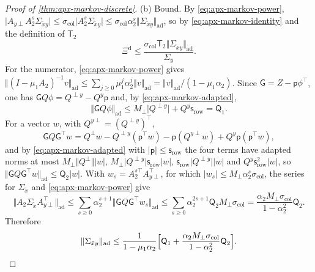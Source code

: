 \begin{proof}[Proof of \cref{thm:apx-markov-discrete}]
(b) Bound. By \eqref{eq:apx-markov-power}, $\lvert A_{y\perp}A_2^s\Sigma_{\tilde xy}\rvert\le\sigma_{\mathrm{col}}\lvert A_2^s\Sigma_{\tilde xy}\rvert\le\sigma_{\mathrm{col}}\alpha_2^s\Vert\Sigma_{\tilde xy}\Vert_{\mathrm{ad}}$, so by \eqref{eq:apx-markov-identity} and the definition of $\mathsf T_2$
\begin{equation}\label{eq:apx-markov-step}
\Xi^{\mathrm d}\le\frac{\sigma_{\mathrm{col}}\mathsf T_2\Vert\Sigma_{\tilde xy}\Vert_{\mathrm{ad}}}{\Sigma_y} .
\end{equation}
For the numerator, \eqref{eq:apx-markov-power} gives $\Vert(I-\mu_1A_2)^{-1}v\Vert_{\mathrm{ad}}\le\sum_{j\ge0}\mu_1^j\alpha_2^j\Vert v\Vert_{\mathrm{ad}}=\Vert v\Vert_{\mathrm{ad}}/(1-\mu_1\alpha_2)$. Since $\mathsf G=Z-\mathsf p\phi^\top$, one has $\mathsf GQ\phi=Q^{\perp y}-Q^y\mathsf p$ and, by \eqref{eq:apx-markov-adapted},
\begin{equation*}
\Vert\mathsf GQ\phi\Vert_{\mathrm{ad}}\le M_\perp\lvert Q^{\perp y}\rvert+Q^y\mathsf s_{\mathrm{row}}=\mathsf Q_1 .
\end{equation*}
For a vector $w$, with $Q^{y\perp}=(Q^{\perp y})^\top$,
\begin{equation*}
\mathsf GQ\mathsf G^\top w=Q^\perp w-Q^{\perp y}(\mathsf p^\top w)-\mathsf p(Q^{y\perp}w)+Q^y\mathsf p(\mathsf p^\top w),
\end{equation*}
and by \eqref{eq:apx-markov-adapted} with $\lvert\mathsf p\rvert\le\mathsf s_{\mathrm{row}}$ the four terms have adapted norms at most $M_\perp\Vert Q^\perp\Vert\lvert w\rvert$, $M_\perp\lvert Q^{\perp y}\rvert\mathsf s_{\mathrm{row}}\lvert w\rvert$, $\mathsf s_{\mathrm{row}}\lvert Q^{\perp y}\rvert\lvert w\rvert$ and $Q^y\mathsf s_{\mathrm{row}}^2\lvert w\rvert$, so $\Vert\mathsf GQ\mathsf G^\top w\Vert_{\mathrm{ad}}\le\mathsf Q_2\lvert w\rvert$. With $w_s=A_2^{s\top}A_{y\perp}^\top$, for which $\lvert w_s\rvert\le M_\perp\alpha_2^s\sigma_{\mathrm{col}}$, the series for $\Sigma_{\tilde x}$ and \eqref{eq:apx-markov-power} give
\begin{equation*}
\bigl\Vert A_2\Sigma_{\tilde x}A_{y\perp}^\top\bigr\Vert_{\mathrm{ad}}\le\sum_{s\ge0}\alpha_2^{s+1}\bigl\Vert\mathsf GQ\mathsf G^\top w_s\bigr\Vert_{\mathrm{ad}}\le\sum_{s\ge0}\alpha_2^{2s+1}\mathsf Q_2M_\perp\sigma_{\mathrm{col}}=\frac{\alpha_2M_\perp\sigma_{\mathrm{col}}}{1-\alpha_2^2}\mathsf Q_2 .
\end{equation*}
Therefore
\begin{equation}\label{eq:apx-markov-cross}
\Vert\Sigma_{\tilde xy}\Vert_{\mathrm{ad}}\le\frac1{1-\mu_1\alpha_2}\Bigl[\mathsf Q_1+\frac{\alpha_2M_\perp\sigma_{\mathrm{col}}}{1-\alpha_2^2}\mathsf Q_2\Bigr].

\end{equation}
\end{proof}
